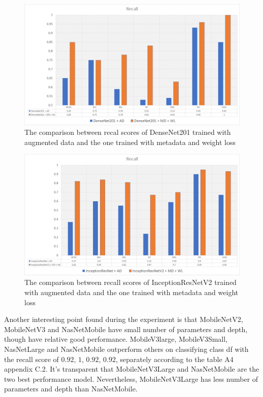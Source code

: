 \documentclass[sensors,article,submit,pdftex,moreauthors]{Definitions/mdpi}
\begin{document}
\begin{figure}[H]
	\centering
	\includegraphics[width=1\linewidth]{Definitions/den re}
	\caption{The comparison between recal scores of DenseNet201 trained with augmented data and the one trained with metadata and weight loss}
	\label{fig:den recall}
\end{figure}
\begin{figure}[H]
	\centering
	\includegraphics[width=1\linewidth]{Definitions/in re}
	\caption{The comparison between recall scores of InceptionResNetV2 trained with augmented data and the one trained with metadata and weight loss}
	\label{fig:incep recall}
\end{figure}

Another interesting point found during the experiment is that MobileNetV2, MobileNetV3 and NasNetMobile have small number of parameters and depth, though have relative good performance. MobileV3large, MobileV3Small, NasNetLarge and NasNetMobile outperform others on classifying class df with the recall score of $0.92$, $1$, $0.92$, $0.92$, separately according to the  table A4 appendix C.2.  It's transparent that MobileNetV3Large and NasNetMobile are the two best performance model. Nevertheless, MobileNetV3Large has less number of parameters and depth than NasNetMobile.
\end{document}
